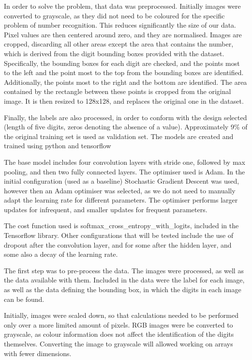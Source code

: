 \documentclass[final,12p,times]{elsarticle}
\begin{document}
In order to solve the problem, that data was preprocessed.
Initially images were converted to grayscale, as they did not need to be coloured for the specific problem of number recognition.
This reduces significantly the size of our data.
Pixel values are then centered around zero, and they are normalised.
Images are cropped, discarding all other areas except the area that contains the number, which is derived from the  digit 
bounding boxes provided with the dataset.
Specifically, the bounding boxes for each digit are checked, and the points most to the left and the point most to the top
from the bounding boxes are identified.
Additionally, the points most to the right and the bottom are identified.
The area contained by the rectangle between these points is cropped from the original image.
It is then resized to 128x128, and replaces the original one in the dataset.

Finally, the labels are also processed, in order to conform with the design selected (length of five digits, 
zeros denoting the absence of a value).
Approximately 9\% of the original training set is used as validation set.
The models are created and trained using python \cite{python} and tensorflow \cite{45166}

The base model includes four convolution layers with stride one, followed by max pooling, and then two fully connected layers.
The optimiser used is Adam.
In the initial configuration (used as a baseline) Stochastic Gradient Descent was used, however then an Adam optimiser was 
selected, as we do not need to manually adapt the learning rate for different parameters.
The optimiser performs larger updates for infrequent, and smaller updates for frequent parameters.

The cost function used is softmax\_cross\_entropy\_with\_logits, included in the Tensorflow library.
Other configurations that will be tested include the use of dropout \cite{Srivastava2014} after the convolution layer, and for 
some after the hidden layer, and some also a decay of the learning rate.

The first step was to pre-process the data.
The images were processed, as well as the data available with them.
Included in the data were the label for each image, as well as the data defining the bounding box, in which the digits in each image can be found.

Initially, images were scaled down, so that calculations needed to be performed only over a more limited amount of pixels.
RGB images were be converted to grayscale, as colour information does not affect the identification of the digits themselves.
Converting the image to grayscale will allowed working on arrays with fewer dimensions.
\end{document}
